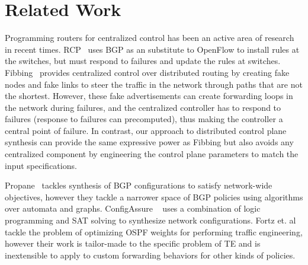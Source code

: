 \section{Related Work}
Programming routers for centralized control has been an
active area of research in recent times. RCP~\cite{rcp} uses
BGP as an substitute to OpenFlow to install rules at the 
switches, but must respond to failures and update the 
rules at switches. Fibbing~\cite{fibbing} provides 
centralized control over distributed routing by creating 
fake nodes and fake links to steer the traffic in the 
network through paths that are not the shortest. However, 
these fake advertisements can create forwarding loops in the
network during failures, and the centralized controller 
has to respond to failures (response to failures can precomputed),
thus making the controller a central point of failure. In contrast,
our approach to distributed control plane synthesis can provide
the same expressive power as Fibbing but also
avoids any centralized component by engineering 
the control plane parameters to match the input specifications. 

 Propane~\cite{propane} 
tackles synthesis of BGP configurations to satisfy network-wide
objectives, however they tackle a narrower space of BGP policies
using algorithms over automata and graphs. ConfigAssure
~\cite{configassure} uses a combination of 
logic programming and SAT solving to synthesize network
configurations. Fortz et. al~\cite{ospf-te} tackle the 
problem of optimizing OSPF weights for performing traffic
engineering, however their work is tailor-made to the 
specific problem of TE and is inextensible to apply 
to custom forwarding behaviors for other kinds of policies.

